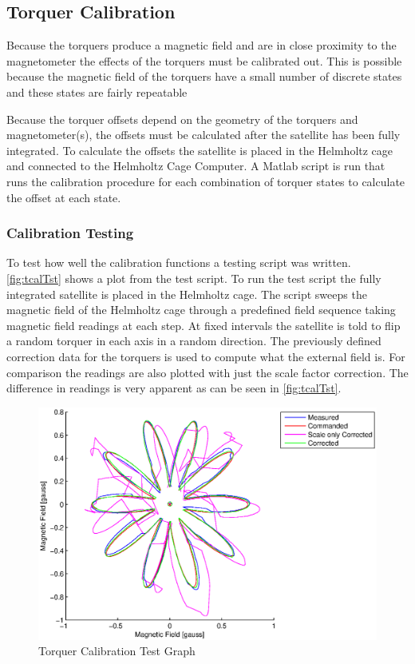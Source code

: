 \subsection{Torquer Calibration}

Because the torquers produce a magnetic field and are in close proximity to the magnetometer the effects of the torquers must be calibrated out. This is possible because the magnetic field of the torquers have a small number of discrete states and these states are fairly repeatable 

Because the torquer offsets depend on the geometry of the torquers and magnetometer(s), the offsets must be calculated after the satellite has been fully integrated. To calculate the offsets the satellite is placed in the Helmholtz cage and connected to the Helmholtz Cage Computer. A Matlab script is run that runs the calibration procedure for each combination of torquer states to calculate the offset at each state. 

\subsubsection{Calibration Testing}

To test how well the calibration functions a testing script was written. \autoref{fig:tcalTst} shows a plot from the test script. To run the test script the fully integrated satellite is placed in the Helmholtz cage. The script sweeps the magnetic field of the Helmholtz cage through a predefined field sequence taking magnetic field readings at each step. At fixed intervals the satellite is told to flip a random torquer in each axis in a random direction. The previously defined correction data for the torquers is used to compute what the external field is. For comparison the readings are also plotted with just the scale factor correction. The difference in readings is very apparent as can be seen in \autoref{fig:tcalTst}.


\begin{figure}[H]
    \centering
    \includegraphics[width=\textwidth]{Figures/torqueCalTst}
    \caption{Torquer Calibration Test Graph}
    \label{fig:tcalTst}
\end{figure}

